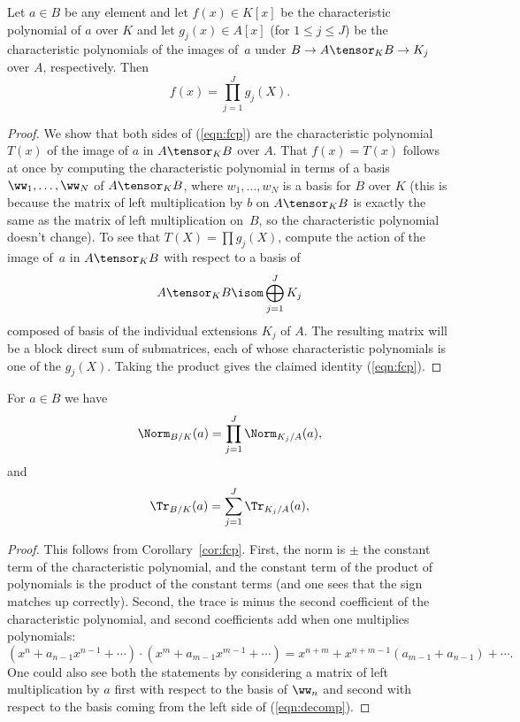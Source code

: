 \begin{corollary}\label{cor:fcp}
  Let $a\in B$ be any element and let $f(x)\in K[x]$ be the
  characteristic polynomial of $a$ over $K$ and let $g_j(x)\in A[x]$
  (for $1\leq j \leq J$) be the characteristic polynomials of the
  images of~$a$ under $B\to A\tensor_K B \to K_j$ over $A$,
  respectively.  Then
\begin{equation}\label{eqn:fcp}
  f(x) = \prod_{j=1}^J g_j(X).
\end{equation}
\end{corollary}
\begin{proof}
  We show that both sides of (\ref{eqn:fcp}) are the characteristic
  polynomial $T(x)$ of the image of $a$ in $A\tensor_K B$ over $A$.
  That $f(x)=T(x)$ follows at once by computing the characteristic
  polynomial in terms of a basis $\ww_1,\ldots, \ww_N$ of $A\tensor_K
  B$, where $w_1,\ldots, w_N$ is a basis for $B$ over $K$ (this is
  because the matrix of left multiplication by $b$ on $A \tensor_K B$
  is exactly the same as the matrix of left multiplication on~$B$, so
  the characteristic polynomial doesn't change).  To see that $T(X) =
  \prod g_j(X)$, compute the action of the image of~$a$ in $A\tensor_K
  B$ with respect to a basis of
\begin{equation}\label{eqn:decomp}
  A\tensor_K B \isom \bigoplus_{j=1}^J K_j
\end{equation}
composed of basis of the individual extensions $K_j$ of $A$.  The
  resulting matrix will be a block direct sum of submatrices, each of
  whose characteristic polynomials is one of the $g_j(X)$.  Taking
  the product gives the claimed identity (\ref{eqn:fcp}).
\end{proof}

\begin{corollary}
For $a\in B$ we have 
$$
 \Norm_{B/K}(a) = \prod_{j=1}^J \Norm_{K_j/A}(a),
$$
and 
$$
 \Tr_{B/K}(a) = \sum_{j=1}^J \Tr_{K_j/A}(a),
$$
\end{corollary}
\begin{proof}
  This follows from Corollary~\ref{cor:fcp}.  First, the norm is $\pm$
  the constant term of the characteristic polynomial, and the constant
  term of the product of polynomials is the product of the constant
  terms (and one sees that the sign matches up correctly).  Second,
  the trace is minus the second coefficient of the characteristic
  polynomial, and second coefficients add when one multiplies
  polynomials:
  $$
  (x^n + a_{n-1}x^{n-1} + \cdots ) \cdot (x^m + a_{m-1}x^{m-1} +
  \cdots ) = x^{n+m} + x^{n+m-1} (a_{m-1} + a_{n-1}) + \cdots.
  $$
  One could also see both the statements by considering a matrix of
  left multiplication by $a$ first with respect to the basis of
  $\ww_n$ and second with respect to the basis coming from the left
  side of (\ref{eqn:decomp}).

\end{proof}



